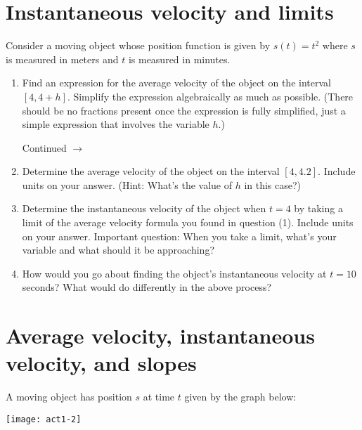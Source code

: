 \documentclass[11pt]{article}
\def\ra{\rightarrow}
\def\pageturn{\vfill 
\begin{flushright}
	\begin{small}
		Continued $\ra$
	\end{small}
\end{flushright} \newpage}
\begin{document}
\section{Instantaneous velocity and limits}

Consider a moving object whose position function is given by $s(t) = t^2$ where $s$ is measured in meters and $t$ is measured in minutes. 

\begin{enumerate}
	\item Find an expression for the average velocity of the object on the interval $[4, 4+h]$. Simplify the expression algebraically as much as possible. (There should be no fractions present once the expression is fully simplified, just a simple expression that involves the variable $h$.)

\pageturn
	
	\item Determine the average velocity of the object on the interval $[4, 4.2]$. Include units on your answer. (Hint: What's the value of $h$ in this case?) 
	
\vspace{0.5in}
	
	\item Determine the instantaneous velocity of the object when $t=4$ by taking a limit of the average velocity formula you found in question (1). Include units on your answer. Important question: When you take a limit, what's your variable and what should it be approaching? 
	
\vspace{2in}	
	
	\item How would you go about finding the object's instantaneous velocity at $t = 10$ seconds? What would do differently in the above process? 
	
	\vspace{0.5in}
	
\end{enumerate}


\section{Average velocity, instantaneous velocity, and slopes}

A moving object has position $s$ at time $t$ given by the graph below: 
\begin{center}
	\texttt{[image: act1-2]}
\end{center}
\end{document}

